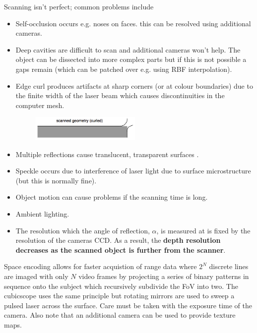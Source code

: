 \documentclass[a4paper]{article}
\newcommand{\ix}[1]{%
  \leavevmode %
  \marginpar{\small\emph{#1}}%
}
\newcommand{\marfig}[2]{
  \marginpar{ \texttt{[image: \#1]} \centering \text{#2} }
}
\begin{document}
Scanning isn't perfect; common problems include\ix{Scanning Problems}
\begin{itemize}
	\item Self-occlusion occurs e.g. noses on faces. this can be resolved using additional cameras. 
	\item Deep cavities are difficult to scan and additional cameras won't help. The object can be dissected into more complex parts but if this is not possible a gaps remain (which can be patched over e.g. using RBF interpolation). 
	\item Edge curl produces artifacts at sharp corners (or at colour boundaries) due to the finite width of the laser beam which causes discontinuities in the computer mesh. \marfig{curl1}{}
	\begin{figure}[H]
		\centering
		\includegraphics[width=0.5\textwidth]{curl2}
	\end{figure}
	\item Multiple reflections cause translucent, transparent surfaces .
	\item Speckle occurs due to interference of laser light due to surface microstructure (but this is normally fine). 
	\item Object motion can cause problems if the scanning time is long. 
	\item Ambient lighting.
	\item The resolution which the angle of reflection, $\alpha$, is measured at is fixed by the resolution of the cameras CCD. As a result, the \textbf{depth resolution decreases as the scanned object is further from the scanner}.\marfig{lasdepres}{}
\end{itemize}

Space encoding allows for faster acquistion of range data where $2^N$ discrete lines are imaged with only $N$ video frames by projecting a series of binary patterns in sequence onto the subject which recursively subdivide the FoV into two. The cubicscope uses the same principle but rotating mirrors are used to sweep a pulsed laser across the surface. Care must be taken with the exposure time of the camera. Also note that an additional camera can be used to provide texture maps.  
\end{document}
